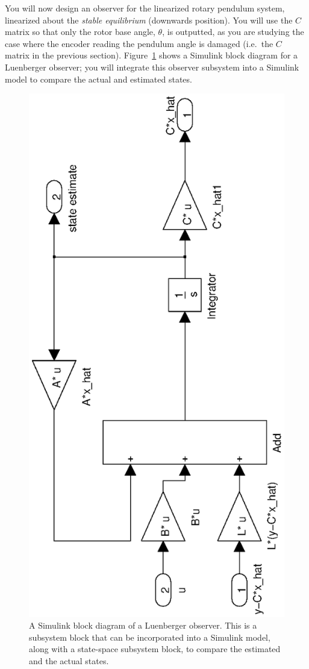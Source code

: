 \begin{enumerate}
          You will now design an observer for the linearized rotary pendulum system, linearized about the \emph{stable equilibrium} (downwards position). You will use the $C$ matrix so that only the rotor base angle, $\theta$, is outputted, as you are studying the case where the encoder reading the pendulum angle is damaged (i.e.\ the \(C\) matrix in the previous section). Figure~\ref{figure:lab3_luenberger_block} shows a Simulink block diagram for a Luenberger observer; you will integrate this observer subsystem into a Simulink model to compare the actual and estimated states.
          \begin{figure}[htb!]
              \centering
              \includegraphics[width=0.4\linewidth,angle=-90]{eps/lab_3/luenberger_subsystem}
              \caption{A Simulink block diagram of a Luenberger observer. This is a subsystem block that can be incorporated into a Simulink model, along with a state-space subsystem block, to compare the estimated and the actual states.}
              \label{figure:lab3_luenberger_block}
          \end{figure}


\end{enumerate}

